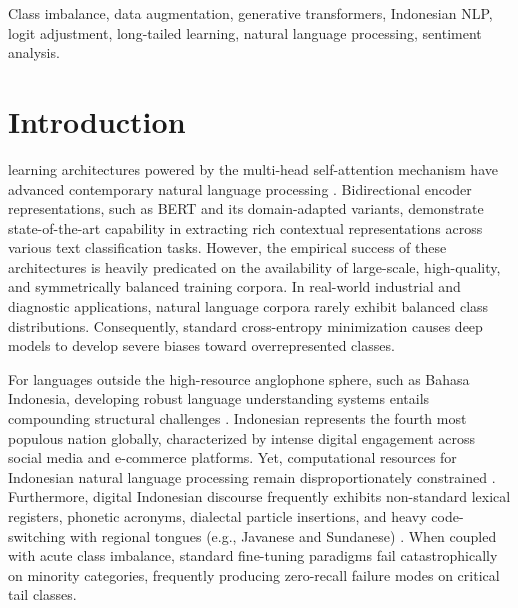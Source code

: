 \documentclass{ieeeaccess}
\begin{document}
\begin{keywords}
Class imbalance, data augmentation, generative transformers, Indonesian NLP, logit adjustment, long-tailed learning, natural language processing, sentiment analysis.
\end{keywords}

\titlepgskip=-15pt

\maketitle

\section{Introduction}

 learning architectures powered by the multi-head self-attention mechanism have advanced contemporary natural language processing \cite{vaswani2017attention, devlin2019bert, koto2021discourse}. Bidirectional encoder representations, such as BERT and its domain-adapted variants, demonstrate state-of-the-art capability in extracting rich contextual representations across various text classification tasks. However, the empirical success of these architectures is heavily predicated on the availability of large-scale, high-quality, and symmetrically balanced training corpora. In real-world industrial and diagnostic applications, natural language corpora rarely exhibit balanced class distributions. Consequently, standard cross-entropy minimization causes deep models to develop severe biases toward overrepresented classes.

For languages outside the high-resource anglophone sphere, such as Bahasa Indonesia, developing robust language understanding systems entails compounding structural challenges \cite{wilie2020indonlu, koto2020indolem}. Indonesian represents the fourth most populous nation globally, characterized by intense digital engagement across social media and e-commerce platforms. Yet, computational resources for Indonesian natural language processing remain disproportionately constrained \cite{cahyawijaya2021indonlg}. Furthermore, digital Indonesian discourse frequently exhibits non-standard lexical registers, phonetic acronyms, dialectal particle insertions, and heavy code-switching with regional tongues (e.g., Javanese and Sundanese) \cite{salsabila2018colloquial}. When coupled with acute class imbalance, standard fine-tuning paradigms fail catastrophically on minority categories, frequently producing zero-recall failure modes on critical tail classes.
\end{document}
